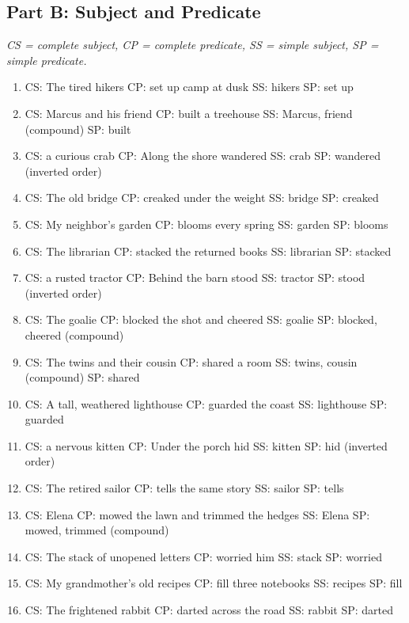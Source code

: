 \documentclass[11pt]{article}
\begin{document}
\subsection*{Part B: Subject and Predicate}
\noindent\textit{CS = complete subject, CP = complete predicate, SS = simple subject, SP = simple predicate.}
\begin{enumerate}
  \item CS: The tired hikers \quad CP: set up camp at dusk \quad SS: hikers \quad SP: set up
  \item CS: Marcus and his friend \quad CP: built a treehouse \quad SS: Marcus, friend (compound) \quad SP: built
  \item CS: a curious crab \quad CP: Along the shore wandered \quad SS: crab \quad SP: wandered \quad (inverted order)
  \item CS: The old bridge \quad CP: creaked under the weight \quad SS: bridge \quad SP: creaked
  \item CS: My neighbor's garden \quad CP: blooms every spring \quad SS: garden \quad SP: blooms
  \item CS: The librarian \quad CP: stacked the returned books \quad SS: librarian \quad SP: stacked
  \item CS: a rusted tractor \quad CP: Behind the barn stood \quad SS: tractor \quad SP: stood \quad (inverted order)
  \item CS: The goalie \quad CP: blocked the shot and cheered \quad SS: goalie \quad SP: blocked, cheered (compound)
  \item CS: The twins and their cousin \quad CP: shared a room \quad SS: twins, cousin (compound) \quad SP: shared
  \item CS: A tall, weathered lighthouse \quad CP: guarded the coast \quad SS: lighthouse \quad SP: guarded
  \item CS: a nervous kitten \quad CP: Under the porch hid \quad SS: kitten \quad SP: hid \quad (inverted order)
  \item CS: The retired sailor \quad CP: tells the same story \quad SS: sailor \quad SP: tells
  \item CS: Elena \quad CP: mowed the lawn and trimmed the hedges \quad SS: Elena \quad SP: mowed, trimmed (compound)
  \item CS: The stack of unopened letters \quad CP: worried him \quad SS: stack \quad SP: worried
  \item CS: My grandmother's old recipes \quad CP: fill three notebooks \quad SS: recipes \quad SP: fill
  \item CS: The frightened rabbit \quad CP: darted across the road \quad SS: rabbit \quad SP: darted

\end{enumerate}
\end{document}
